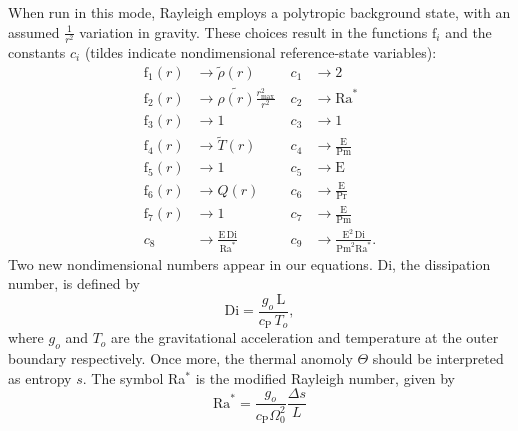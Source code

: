 \documentclass[10pt, letterpaper]{article}
\newcommand{\ff}{\mathrm{f}}
\begin{document}
When run in this mode, Rayleigh employs a polytropic background state, with an assumed $\frac{1}{r^2}$ variation in gravity.  These choices result in the functions $\ff_i$ and the constants $c_i$ (tildes indicate nondimensional reference-state variables):
\begin{align*}
\ff_1(r) &\rightarrow \tilde{\rho}(r)\; &c_1 &\rightarrow 2 \\
\ff_2(r) &\rightarrow \tilde{\rho(r)}\frac{r_\mathrm{max}^2}{r^2}\; &c_2 &\rightarrow \mathrm{Ra}^* \\
\ff_3(r) &\rightarrow 1\; &c_3 &\rightarrow 1\\
\ff_4(r) &\rightarrow \tilde{T}(r)\; &c_4 &\rightarrow \frac{\mathrm{E}}{\mathrm{Pm}} \\
\ff_5(r) &\rightarrow 1\; &c_5 &\rightarrow \mathrm{E} \\
\ff_6(r) &\rightarrow Q(r)\; &c_6 &\rightarrow \frac{\mathrm{E}}{\mathrm{Pr}}  \\
\ff_7(r) &\rightarrow 1 \; &c_7 &\rightarrow \frac{\mathrm{E}}{\mathrm{Pm}} \\
c_8&\rightarrow \frac{\mathrm{E}\,\mathrm{Di}}{\mathrm{Ra}^*} &c_9 &\rightarrow \frac{\mathrm{E}^2\,\mathrm{Di}}{\mathrm{Pm}^2\mathrm{Ra}^*}.
\end{align*}
Two new nondimensional numbers appear in our equations. Di,  the dissipation number, is defined by
\begin{equation}
\mathrm{Di}= \frac{g_o\,\mathrm{L}}{c_\mathrm{P}\,T_o},
\end{equation}
where $g_o$ and $T_o$ are the gravitational acceleration and temperature at the outer boundary respectively.   Once more, the thermal anomoly $\Theta$ should be interpreted as entropy $s$.   The symbol Ra$^*$ is the modified Rayleigh number, given by
\begin{equation}
\mathrm{Ra}^*=\frac{g_o}{c_\mathrm{P}\Omega_0^2}\frac{\Delta s}{L}   %
\end{equation}
\end{document}

